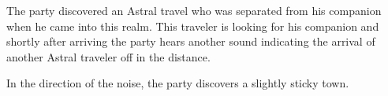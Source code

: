The party discovered an Astral travel who was separated from his companion when he came into this realm.
This traveler is looking for his companion and shortly after arriving the party hears another sound indicating the arrival of another Astral traveler off in the distance.

In the direction of the noise, the party discovers a slightly sticky town.